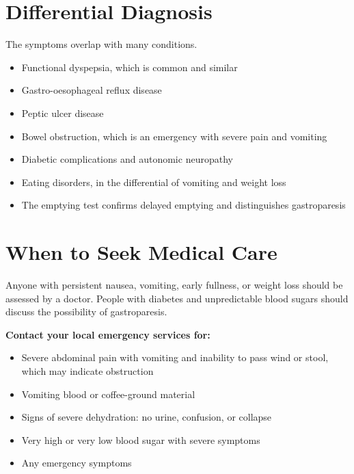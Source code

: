 \section*{Differential Diagnosis}
The symptoms overlap with many conditions.
\begin{itemize}
    \item Functional dyspepsia, which is common and similar
    \item Gastro-oesophageal reflux disease
    \item Peptic ulcer disease
    \item Bowel obstruction, which is an emergency with severe pain and vomiting
    \item Diabetic complications and autonomic neuropathy
    \item Eating disorders, in the differential of vomiting and weight loss
    \item The emptying test confirms delayed emptying and distinguishes gastroparesis
\end{itemize}

\section*{When to Seek Medical Care}
Anyone with persistent nausea, vomiting, early fullness, or weight loss should be assessed by a doctor. People with diabetes and unpredictable blood sugars should discuss the possibility of gastroparesis.

\textbf{Contact your local emergency services for:}
\begin{itemize}
    \item Severe abdominal pain with vomiting and inability to pass wind or stool, which may indicate obstruction
    \item Vomiting blood or coffee-ground material
    \item Signs of severe dehydration: no urine, confusion, or collapse
    \item Very high or very low blood sugar with severe symptoms
    \item Any emergency symptoms
\end{itemize}

